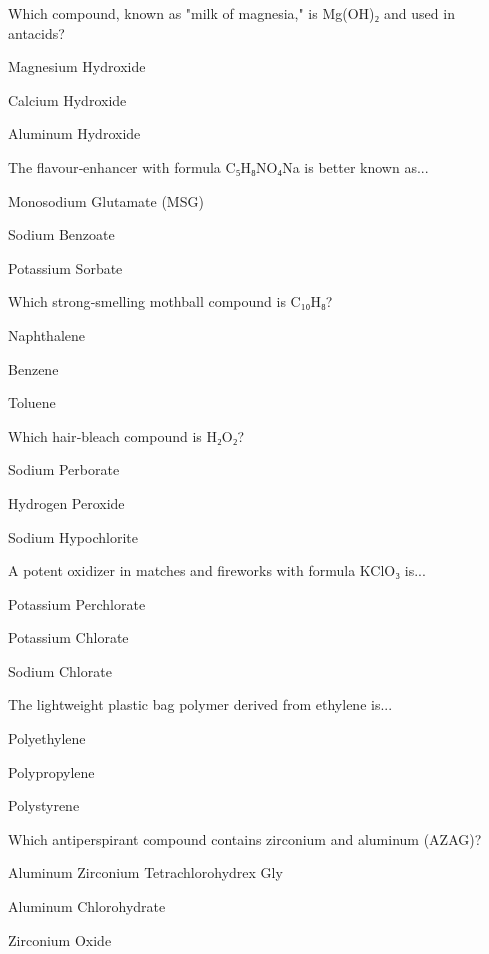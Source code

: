 \begin{enhancedmcq}{Which compound, known as "milk of magnesia," is Mg(OH)₂ and used in antacids?}
\item Magnesium Hydroxide
\item Calcium Hydroxide
\item Aluminum Hydroxide

\end{enhancedmcq}
\begin{enhancedmcq}{The flavour‑enhancer with formula C₅H₈NO₄Na is better known as...}
\item Monosodium Glutamate (MSG)
\item Sodium Benzoate
\item Potassium Sorbate

\end{enhancedmcq}
\begin{enhancedmcq}{Which strong‑smelling mothball compound is C₁₀H₈?}
\item Naphthalene
\item Benzene
\item Toluene

\end{enhancedmcq}
\begin{enhancedmcq}{Which hair‑bleach compound is H₂O₂?}
\item Sodium Perborate
\item Hydrogen Peroxide
\item Sodium Hypochlorite

\end{enhancedmcq}
\begin{enhancedmcq}{A potent oxidizer in matches and fireworks with formula KClO₃ is...}
\item Potassium Perchlorate
\item Potassium Chlorate
\item Sodium Chlorate

\end{enhancedmcq}
\begin{enhancedmcq}{The lightweight plastic bag polymer derived from ethylene is...}
\item Polyethylene
\item Polypropylene
\item Polystyrene

\end{enhancedmcq}
\begin{enhancedmcq}{Which antiperspirant compound contains zirconium and aluminum (AZAG)?}
\item Aluminum Zirconium Tetrachlorohydrex Gly
\item Aluminum Chlorohydrate
\item Zirconium Oxide

\end{enhancedmcq}
